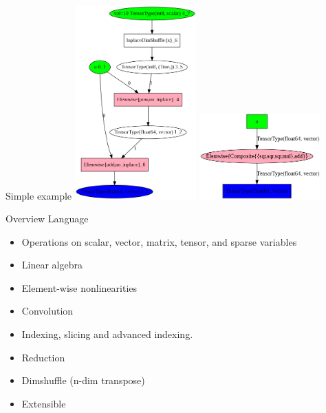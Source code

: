 \documentclass[utf8x,xcolor=pdftex,dvipsnames,table]{beamer}
\begin{document}
\begin{frame}{Simple example}
\center
\includegraphics[width=0.35\textwidth]{pics/f_unoptimized.png}
\hspace{0.1\textwidth}
\includegraphics[width=0.35\textwidth]{pics/f_optimized.png}
\end{frame}



\begin{frame}{Overview Language}
  \begin{itemize}
  \item Operations on scalar, vector, matrix, tensor, and sparse variables
  \item Linear algebra
  \item Element-wise nonlinearities
  \item Convolution
  \item Indexing, slicing and advanced indexing.
  \item Reduction
  \item Dimshuffle (n-dim transpose)
  \item Extensible
  \end{itemize}
\end{frame}
\end{document}
